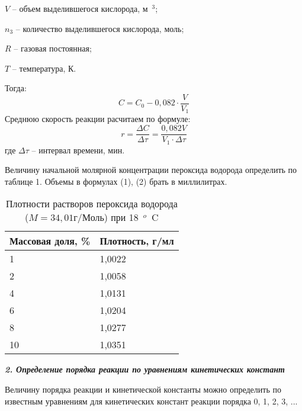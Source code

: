 $V$ -- объем выделившегося кислорода, м~$^{3}$;

$n_{3}$ -- количество выделившегося кислорода, моль;

$R$ -- газовая постоянная;

$T$ -- температура, К.

Тогда: 
$$C=C_{0}-0,082\cdot\frac{V}{V_{1}}$$
Среднюю скорость реакции расчитаем по формуле:
$$r=\frac{\Delta C}{\Delta\tau}=\frac{0,082V}{V_{1}\cdot\Delta\tau}$$
где $\Delta\tau$ -- интервал времени, мин.

Величину начальной молярной концентрации пероксида водорода определить по таблице 1. Объемы в формулах (1), (2) брать в миллилитрах.

\begin{table}[h]
\caption{Плотности растворов пероксида водорода ($M=34,01$г/Моль) при 18~$^{o}$~C}
\label{tabular:data22_1}
\begin{center}
\begin{tabular}{|p{5cm}|p{5cm}|}
\hline
Массовая доля, \% & Плотность, г/мл \\
\hline
1 & 1,0022\\
\hline
2 & 1,0058\\
\hline
4 & 1,0131\\
\hline
6 & 1,0204\\
\hline
8 & 1,0277\\
\hline
10 & 1,0351\\
\hline
\end{tabular}
\end{center}
\end{table}

\textit{\textbf{2. Определение порядка реакции по уравнениям кинетических констант}}

Величину порядка реакции и кинетической константы можно определить по известным уравнениям для кинетических констант реакции порядка 0, 1, 2, 3, ...

